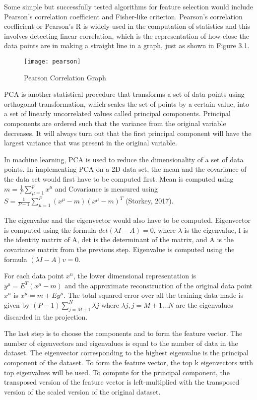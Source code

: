 Some simple but successfully tested algorithms for feature selection would include Pearson's correlation coefficient and Fisher-like criterion. Pearson's correlation coefficient or Pearson's R is widely used in the computation of statistics and this involves detecting linear correlation, which is the representation of how close the data points are in making a straight line in a graph, just as shown in Figure 3.1.

\begin{figure}[h]
\caption{Pearson Correlation Graph}
\centering
\texttt{[image: pearson]}
\end{figure}

PCA is another statistical procedure that transforms a set of data points using orthogonal transformation, which scales the set of points by a certain value, into a set of linearly uncorrelated values called principal components. Principal components are ordered such that the variance from the original variable decreases. It will always turn out that the first principal component will have the largest variance that was present in the original variable.

In machine learning, PCA is used to reduce the dimensionality of a set of data points. In implementing PCA on a 2D data set, the mean and the covariance of the data set would first have to be computed first. Mean is computed using $m = \frac{1}{P}\sum_{\mu=1}^{p} x^\mu$ and Covariance is measured using $S = \frac{1}{P-1}\sum_{\mu=1}^{P} (x^\mu-m)(x^\mu-m)^T$ (Storkey, 2017).

The eigenvalue and the eigenvector would also have to be computed. Eigenvector is computed using the formula $det(\lambda I - A ) = 0$, where $\lambda$ is the eigenvalue, I is the identity matrix of A, det is the determinant of the matrix, and A is the covariance matrix from the previous step. Eigenvalue is computed using the formula $( \lambda I - A )v = 0$.

For each data point $x^n$, the lower dimensional representation is $y^\mu = E^T(x^\mu - m)$ and the approximate reconstruction of the original data point $x^n$ is $x^\mu = m+Ey^\mu$. The total squared error over all the training data made is given by $(P-1)\sum_{j=M+1}^{N} \lambda j$ where $\lambda j , j = M + 1 . . . N$ are the eigenvalues discarded in the projection.

The last step is to choose the components and to form the feature vector. The number of eigenvectors and eigenvalues is equal to the number of data in the dataset. The eigenvector corresponding to the highest eigenvalue is the principal component of the dataset. To form the feature vector, the top k eigenvectors with top eigenvalues will be  used. To compute for the principal component, the transposed version of the feature vector is left-multiplied with the transposed version of the scaled version of the original dataset.

